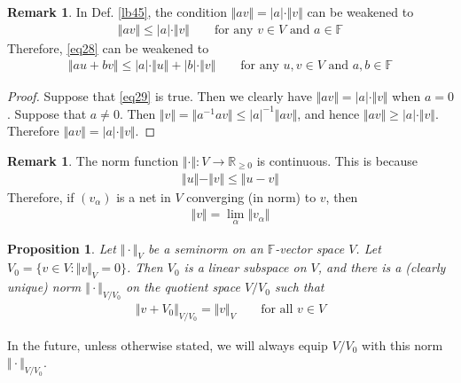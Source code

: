 \documentclass[12pt,b5paper,notitlepage]{article}
\theoremstyle{definition}
\newtheorem{rem}[df]{Remark}
\theoremstyle{plain}
\newtheorem{pp}[df]{Proposition}
\newcommand{\Rbb}{\mathbb R}
\newcommand{\Fbb}{\mathbb F}
\numberwithin{equation}{section}
\begin{document}
\begin{rem}\label{lb46}
In Def. \ref{lb45}, the condition $\Vert av\Vert=|a|\cdot\Vert v\Vert$ can be weakened to
\begin{align}\label{eq29}
\Vert av\Vert\leq|a|\cdot\Vert v\Vert\qquad\text{for any $v\in V$ and $a\in\Fbb$}
\end{align}
Therefore, \eqref{eq28} can be weakened to
\begin{align}
\Vert au+bv\Vert\leq |a|\cdot\Vert u\Vert+|b|\cdot\Vert v\Vert\qquad\text{for any $u,v\in V$ and $a,b\in\Fbb$}
\end{align}
\end{rem}

\begin{proof}
Suppose that \eqref{eq29} is true. Then we clearly have $\Vert av\Vert=|a|\cdot\Vert v\Vert$ when $a=0$. Suppose that $a\neq 0$. Then $\Vert v\Vert=\Vert a^{-1}av\Vert\leq |a|^{-1}\Vert a v\Vert$, and hence $\Vert av\Vert\geq |a|\cdot\Vert v\Vert$. Therefore $\Vert av\Vert=|a|\cdot\Vert v\Vert$.
\end{proof}



\begin{rem}\label{lb59}
The norm function $\Vert\cdot\Vert:V\rightarrow\Rbb_{\geq0}$ is continuous. This is because
\begin{align}
\Vert u\Vert-\Vert v\Vert\leq \Vert u-v\Vert
\end{align}
Therefore, if $(v_\alpha)$ is a net in $V$ converging (in norm) to $v$, then
\begin{align*}
\Vert v\Vert=\lim_\alpha\Vert v_\alpha\Vert
\end{align*}
\end{rem}

\begin{pp}\label{lb47}
Let $\Vert\cdot\Vert_V$ be a seminorm on an $\Fbb$-vector space $V$. Let $V_0=\{v\in V:\Vert v\Vert_V=0\}$. Then $V_0$ is a linear subspace on $V$, and there is a (clearly unique) norm $\Vert\cdot\Vert_{V/V_0}$ on the quotient space $V/V_0$ such that
\begin{align}\label{eq27}
\Vert v+V_0\Vert_{V/V_0}=\Vert v\Vert_V\qquad\text{for all }v\in V
\end{align}
\end{pp}

In the future, unless otherwise stated, we will always equip $V/V_0$ with this norm $\Vert\cdot\Vert_{V/V_0}$.
\end{document}

